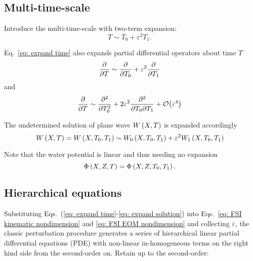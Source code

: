 \subsection{Multi-time-scale}
Introduce the multi-time-scale with two-term expansion:
\begin{equation}
    T \sim T_0 + \varepsilon^2 T_1.
    \label{eq: expand time}
\end{equation}

Eq.~\eqref{eq: expand time} also expands partial differential operators about time \ensuremath{T}
\begin{equation}
    \pdv{}{T} \sim \pdv{}{T_0} + \varepsilon^2 \pdv{}{T_1}
    \label{eq: expand time dt}
\end{equation}
and
\begin{equation}
    \pdv{}{T} \sim \pdv[2]{}{T_0} + 2 \varepsilon^2 \pdv{}{T_0}{T_1} + \order{\varepsilon^4}
    \label{eq: expand time ddt}
\end{equation}

The undetermined solution of plane wave \ensuremath{W\bkt{X,T}} is expanded accordingly
\begin{equation}
    W\left(X,T\right) = W\left(X,T_0,T_1\right) \sim W_0\left(X,T_0,T_1\right) + \varepsilon^2 W_1\left(X,T_0,T_1\right) 
    \label{eq: expand solution}
\end{equation}

Note that the water potential is linear and thus needing no expansion
\begin{equation}
    \Phi\left(X,Z,T\right) = \Phi\left(X,Z,T_0,T_1\right).
\end{equation}


\subsection{Hierarchical equations}
Substituting Eqs.~(\ref{eq: expand time}-\ref{eq: expand solution}) into Eqs.~\eqref{eq: FSI kinematic nondimension} and \eqref{eq: FSI EOM nondimension} and collecting \ensuremath{\varepsilon}, the classic perturbation procedure generates a series of hierarchical linear partial differential equations (PDE) with non-linear in-homogeneous terms on the right hind side from the second-order on. Retain up to the second-order:

